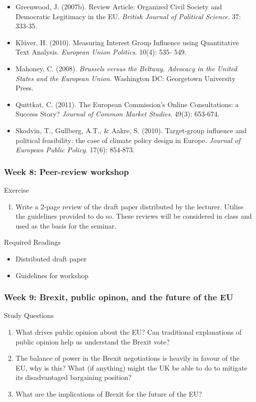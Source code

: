 \begin{itemize}
	\item Greenwood, J. (2007b). Review Article: Organized Civil Society and Democratic Legitimacy in the EU. \textit{British Journal of Political Science}. 37: 333-35. 
	\item Kl\"{u}ver, H. (2010). Measuring Interest Group Influence using Quantitative Text Analysis. \textit{European Union Politics}. 10(4): 535- 549.
	\item Mahoney, C. (2008). \textit{Brussels versus the Beltway. Advocacy in the United States and the European Union}. Washington DC: Georgetown University Press.
	\item Quittkat, C. (2011). The European Commission’s Online Consultations: a Success Story? \textit{Journal of Common Market Studies}. 49(3): 653-674.
	\item Skodvin, T., Gullberg, A.T., \& Aakre, S. (2010). Target-group influence and political feasibility: the case of climate policy design in Europe. \textit{Journal of European Public Policy}. 17(6): 854-873.
\end{itemize}


\subsubsection*{Week 8: Peer-review workshop}

Exercise

\begin{enumerate}
	\item Write a 2-page review of the draft paper distributed by the lecturer. Utilise the guidelines provided to do so. These reviews will be considered in class and used as the basis for the seminar.
\end{enumerate}

\noindent Required Readings

\begin{itemize}
	\item Distributed draft paper
	\item Guidelines for workshop
\end{itemize}


\subsubsection*{Week 9: Brexit, public opinon, and the future of the EU} 

Study Questions

\begin{enumerate}
	\item What drives public opinion about the EU? Can traditional explanations of public opinion help us understand the Brexit vote?
	\item The balance of power in the Brexit negotiations is heavily in favour of the EU, why is this? What (if anything) might the UK be able to do to mitigate its disadvantaged bargaining position?
	\item What are the implications of Brexit for the future of the EU?
\end{enumerate}

